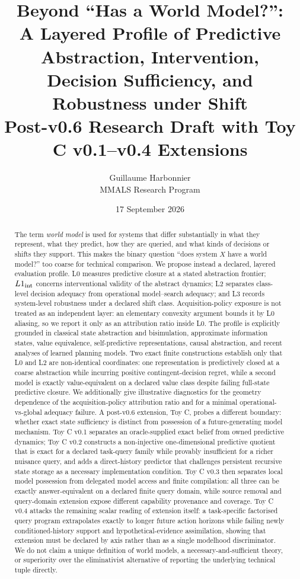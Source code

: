 \documentclass[10pt]{article}
\title{\textbf{Beyond ``Has a World Model?'':}\\
A Layered Profile of Predictive Abstraction, Intervention,\\
Decision Sufficiency, and Robustness under Shift\\[0.35em]
\large Post-v0.6 Research Draft with Toy C v0.1--v0.4 Extensions}
\author{Guillaume Harbonnier\\MMALS Research Program}
\date{17 September 2026}
\begin{document}
\maketitle

\begin{abstract}
The term \emph{world model} is used for systems that differ substantially in what they represent, what they predict, how they are queried, and what kinds of decisions or shifts they support. This makes the binary question ``does system $X$ have a world model?'' too coarse for technical comparison. We propose instead a declared, layered evaluation profile. L0 measures predictive closure at a stated abstraction frontier; $L1_{\rm int}$ concerns interventional validity of the abstract dynamics; L2 separates class-level decision adequacy from operational model--search adequacy; and L3 records system-level robustness under a declared shift class. Acquisition-policy exposure is not treated as an independent layer: an elementary convexity argument bounds it by L0 aliasing, so we report it only as an attribution ratio inside L0. The profile is explicitly grounded in classical state abstraction and bisimulation, approximate information states, value equivalence, self-predictive representations, causal abstraction, and recent analyses of learned planning models. Two exact finite constructions establish only that L0 and L2 are non-identical coordinates: one representation is predictively closed at a coarse abstraction while incurring positive contingent-decision regret, while a second model is exactly value-equivalent on a declared value class despite failing full-state predictive closure. We additionally give illustrative diagnostics for the geometry dependence of the acquisition-policy attribution ratio and for a minimal operational-vs-global adequacy failure. A post-v0.6 extension, Toy C, probes a different boundary: whether exact state sufficiency is distinct from possession of a future-generating model mechanism. Toy C v0.1 separates an oracle-supplied exact belief from owned predictive dynamics; Toy C v0.2 constructs a non-injective one-dimensional predictive quotient that is exact for a declared task-query family while provably insufficient for a richer nuisance query, and adds a direct-history predictor that challenges persistent recursive state storage as a necessary implementation condition. Toy C v0.3 then separates local model possession from delegated model access and finite compilation: all three can be exactly answer-equivalent on a declared finite query domain, while source removal and query-domain extension expose different capability provenance and coverage. Toy C v0.4 attacks the remaining scalar reading of extension itself: a task-specific factorised query program extrapolates exactly to longer future action horizons while failing newly conditioned-history support and hypothetical-evidence assimilation, showing that extension must be declared by axis rather than as a single modelhood discriminator. We do not claim a unique definition of world models, a necessary-and-sufficient theory, or superiority over the eliminativist alternative of reporting the underlying technical tuple directly.
\end{abstract}
\end{document}
